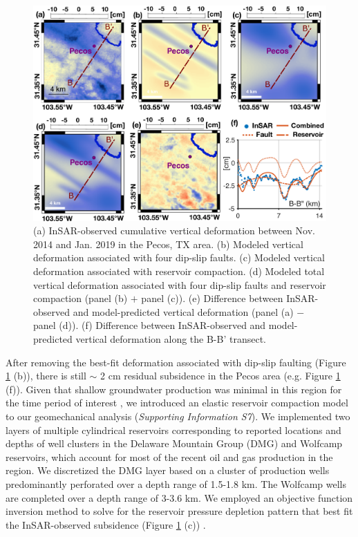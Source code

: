 \documentclass{utexasthesis}
\begin{document}
\begin{figure}[hbt!]
	\centering
	\includegraphics[width=\linewidth]{paper1-permian/figures/figure5-modeling.pdf}
	\caption[Modeled surface deformation from fault slip and reservoir subsidence]{(a) InSAR-observed cumulative vertical deformation between Nov. 2014 and Jan. 2019 in the Pecos, TX area. (b) Modeled vertical deformation associated with four dip-slip faults. (c) Modeled vertical deformation associated with reservoir compaction. (d) Modeled total vertical deformation associated with four dip-slip faults and reservoir compaction (panel (b) $+$ panel (c)). (e) Difference between InSAR-observed and model-predicted vertical deformation (panel (a) $-$ panel (d)). (f) Difference between InSAR-observed and model-predicted vertical deformation along the B-B' transect.}
	\label{fig:model}
\end{figure}


After removing the best-fit deformation associated with dip-slip faulting (Figure \ref{fig:model} (b)), there is still $\sim$ 2 cm residual subsidence in the Pecos area (e.g. Figure \ref{fig:model} (f)). Given that shallow groundwater production was minimal in this region for the time period of interest \cite{deng2020surface}, we introduced an elastic reservoir compaction model \cite{Geertsma1973} to our geomechanical analysis (\textit{Supporting Information S7}). We implemented two layers of multiple cylindrical reservoirs corresponding to reported locations and depths of well clusters in the Delaware Mountain Group (DMG) and Wolfcamp reservoirs, which account for most of the recent oil and gas production in the region. We discretized the DMG layer based on a cluster of production wells predominantly perforated over a depth range of 1.5-1.8 km. The Wolfcamp wells are completed over a depth range of 3-3.6 km. We employed an objective function inversion method to solve for the reservoir pressure depletion pattern that best fit the InSAR-observed subsidence (Figure \ref{fig:model} (c)) \cite{Du2001}.
\end{document}
